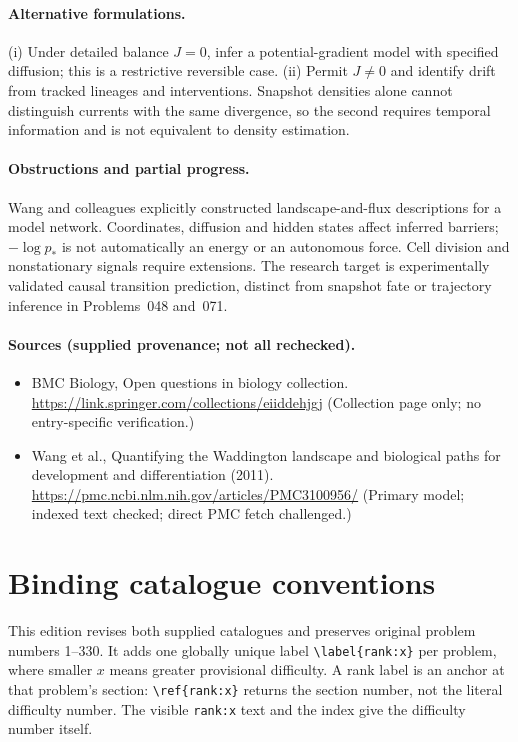 \documentclass[11pt]{article}
\begin{document}
\paragraph{Alternative formulations.} (i) Under detailed balance $J=0$, infer a potential-gradient model with specified diffusion; this is a restrictive reversible case. (ii) Permit $J\neq0$ and identify drift from tracked lineages and interventions. Snapshot densities alone cannot distinguish currents with the same divergence, so the second requires temporal information and is not equivalent to density estimation.
\paragraph{Obstructions and partial progress.} Wang and colleagues explicitly constructed landscape-and-flux descriptions for a model network. Coordinates, diffusion and hidden states affect inferred barriers; $-\log p_*$ is not automatically an energy or an autonomous force. Cell division and nonstationary signals require extensions. The research target is experimentally validated causal transition prediction, distinct from snapshot fate or trajectory inference in Problems~048 and~071.
\paragraph{Sources (supplied provenance; not all rechecked).} \begin{itemize}
\item BMC Biology, Open questions in biology collection. \url{https://link.springer.com/collections/eiiddehjgj} (Collection page only; no entry-specific verification.)
\item Wang et al., Quantifying the Waddington landscape and biological paths for development and differentiation (2011). \url{https://pmc.ncbi.nlm.nih.gov/articles/PMC3100956/} (Primary model; indexed text checked; direct PMC fetch challenged.)
\end{itemize}


\section*{Binding catalogue conventions}
This edition revises both supplied catalogues and preserves original problem numbers 1--330. It adds one globally unique label \verb|\label{rank:x}| per problem, where smaller $x$ means greater provisional difficulty. A rank label is an anchor at that problem's section: \verb|\ref{rank:x}| returns the section number, not the literal difficulty number. The visible \texttt{rank:x} text and the index give the difficulty number itself.
\end{document}
